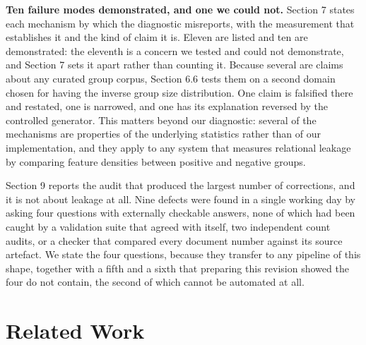 \documentclass[twoside,11pt]{article}
\begin{document}
\textbf{Ten failure modes demonstrated, and one we could not.} Section 7 states each mechanism by which the diagnostic misreports, with the measurement that establishes it and the kind of claim it is. Eleven are listed and ten are demonstrated: the eleventh is a concern we tested and could not demonstrate, and Section 7 sets it apart rather than counting it. Because several are claims about any curated group corpus, Section 6.6 tests them on a second domain chosen for having the inverse group size distribution. One claim is falsified there and restated, one is narrowed, and one has its explanation reversed by the controlled generator. This matters beyond our diagnostic: several of the mechanisms are properties of the underlying statistics rather than of our implementation, and they apply to any system that measures relational leakage by comparing feature densities between positive and negative groups.

Section 9 reports the audit that produced the largest number of corrections, and it is not about leakage at all. Nine defects were found in a single working day by asking four questions with externally checkable answers, none of which had been caught by a validation suite that agreed with itself, two independent count audits, or a checker that compared every document number against its source artefact. We state the four questions, because they transfer to any pipeline of this shape, together with a fifth and a sixth that preparing this revision showed the four do not contain, the second of which cannot be automated at all.

\section{Related Work}
\end{document}
